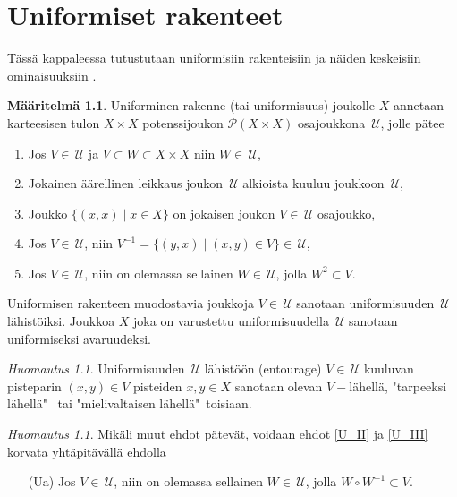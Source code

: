 \documentclass[12pt,a4paper,leqno]{report}
\newcommand{\U}{\,\mathcal{U}}
\newcommand{\Pot}{\mathcal{P}}
\theoremstyle{plain}
\theoremstyle{definition}
\newtheorem{maar}[equation]{Määritelmä}
\theoremstyle{remark}
\newtheorem{huom}[equation]{Huomautus}
\begin{document}
\chapter{Uniformiset rakenteet}
Tässä kappaleessa tutustutaan uniformisiin rakenteisiin ja näiden keskeisiin ominaisuuksiin \cite{Eom1}.
\begin{maar}\label{uniformi_maar}
Uniforminen rakenne (tai uniformisuus) joukolle $X$ annetaan karteesisen tulon $X\times X$ potenssijoukon $\Pot(X\times X)$ osajoukkona $\U$, jolle pätee %
\begin{enumerate} [label=(U\arabic*),ref=(U\arabic*)]
\item\label{F_I} Jos $V\in \U$ ja $V\subset W\subset X\times X$ niin $ W\in\U$,
\item\label{F_II} Jokainen äärellinen leikkaus joukon $\U$ alkioista kuuluu joukkoon $\U$,
\item\label{U_I} Joukko $\{(x,x)\mid x\in X\}$ on jokaisen joukon $V\in\U$ osajoukko,
\item\label{U_II} Jos $V\in\U$, niin $V^{-1}=\{(y,x)\mid (x,y)\in V\}\in\U$,
\item\label{U_III} Jos $V\in \U$, niin on olemassa sellainen $W\in \U$, jolla $ W^2\subset V$.%
\end{enumerate}
Uniformisen rakenteen muodostavia joukkoja $ V\in\U$ sanotaan uniformisuuden $\U$ lähistöiksi. 
Joukkoa $X$ joka on varustettu uniformisuudella $\U$ sanotaan uniformiseksi avaruudeksi.
\end{maar}
\begin{huom}
Uniformisuuden $\U$ lähistöön (entourage) $V\in\U $ kuuluvan pisteparin $(x,y)\in V$ pisteiden $x,y\in X$ sanotaan olevan $V-$lähellä, "tarpeeksi lähellä" \, tai 
"mielivaltaisen lähellä"\, toisiaan.
\end{huom}
\begin{huom}
Mikäli muut ehdot pätevät, voidaan ehdot \ref{U_II} ja \ref{U_III} korvata yhtäpitävällä ehdolla 
\begin{enumerate}
\item[(Ua)] \label{Uaehto} 
Jos $V\in \U$, niin on olemassa sellainen $W\in \U$, jolla $ W\circ W^{-1}\subset V$.
\end{enumerate}
%
\end{huom}
\end{document}
